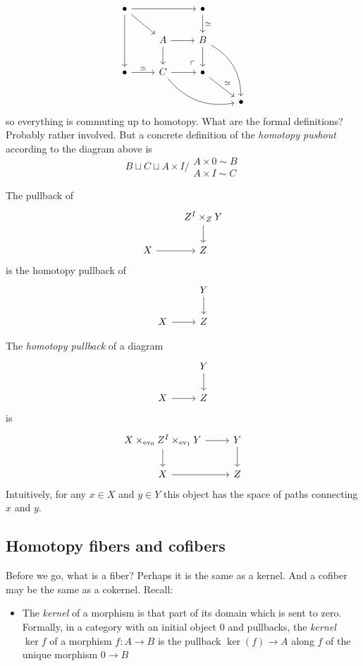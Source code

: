 \begin{definition}
\begin{remark}
		$$\begin{tikzcd}
			\bullet\arrow[rr]\arrow[dd]\arrow[dr]&&\bullet\arrow[d,"\simeq "]\\
			&A\arrow[r]\arrow[d]&B\arrow[d]\arrow[ddr,bend left]\\
			\bullet\arrow[r,"\simeq "]&C\arrow[r]\arrow[drr,bend right]&\bullet\arrow[ul, phantom, "\ulcorner", very near start]\arrow[dr,"\simeq" ]\\
			&&&\bullet
		\end{tikzcd}$$
	so everything is commuting up to homotopy. {\color{magenta}What are the formal definitions? Probably rather involved.} But a concrete definition of the {\it homotopy pushout} according to the diagram above is
	$$B\sqcup C\sqcup A\times I\Big/\substack{A\times 0\sim B \\ A\times I\sim C}$$
\end{remark}
\begin{remark}
		The pullback of
	$$\begin{tikzcd}
		&Z^I\times_ZY\arrow[d]\\
		X\arrow[r]&Z
	\end{tikzcd}$$
	is the homotopy pullback of
	$$\begin{tikzcd}
		&Y\arrow[d]\\
		X\arrow[r]&Z
	\end{tikzcd}$$
\end{remark}
\begin{definition}
	The {\it homotopy pullback} of a diagram
		$$\begin{tikzcd}
			&Y\arrow[d]\\
			X\arrow[r]&Z
		\end{tikzcd}$$
		is
		$$\begin{tikzcd}
			X\times_{\text{ev}_0}Z^I\times_{\text{ev}_1}Y\arrow[d]\arrow[r]&Y\arrow[d]\\
			X\arrow[r]&Z
		\end{tikzcd}$$
		Intuitively, for any $x\in X$ and $y\in Y$ this object has the space of paths connecting $x$ and $y$.
\end{definition}

\subsection{Homotopy fibers and cofibers}

Before we go, what is a fiber? Perhaps it is the same as a kernel. And a cofiber may be the same as a cokernel. Recall:
\begin{definition}  
	\begin{itemize}
		\item The {\it kernel} of a morphism is that part of its domain which is sent to zero. Formally, in a category with an initial object 0 and pullbacks, the {\it kernel $\ker f$} of a morphism $f:A\to B$ is the pullback $\ker(f)\to A$ along $f$ of the unique morphism $0\to B$
		

\end{itemize}
\end{definition}
\end{definition}

